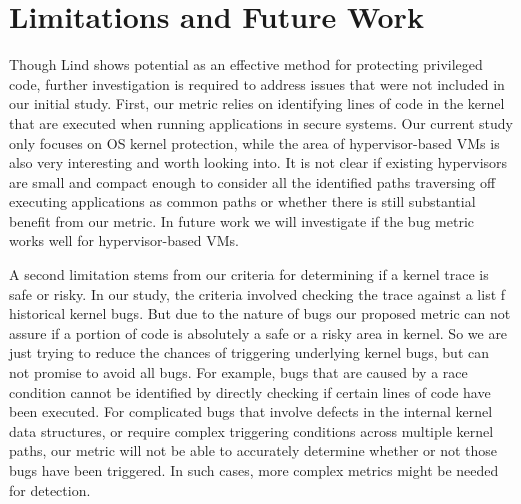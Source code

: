 \section{Limitations and Future Work}
\label{sec.limitation}

Though Lind shows potential as an effective method for protecting privileged code,
further investigation is required to address issues that were not included in our
initial study.
First, our metric relies on identifying lines of code in the kernel that are 
executed when running applications in secure systems. 
Our current study only focuses on OS kernel protection, while the area of hypervisor-based
VMs is also very interesting and worth looking into.  
It is not clear if 
existing hypervisors are small and compact enough to consider all the 
identified paths traversing off executing applications as common paths or 
whether there is still substantial benefit from our metric. 
In %
future work we will %
investigate if the bug metric works well for %
hypervisor-based VMs.

A second limitation stems from our criteria for determining if a kernel trace is
safe or risky. In our study, the criteria involved checking the trace against a list
 f historical kernel bugs.
But due to the nature of bugs our proposed metric can not assure if a portion of code
is absolutely a safe or a risky area in kernel.
So we are just trying to reduce the chances of triggering underlying kernel bugs, but can 
not promise to avoid all bugs. 
For example, bugs that are caused
by a race condition cannot be identified by directly checking if certain lines of
code have been executed. For complicated bugs that involve defects in the internal
kernel data structures, or require complex triggering conditions across multiple
kernel paths, our metric will not be able to accurately determine whether or not
those bugs have been triggered. In such cases, more complex metrics might be needed
 for detection.




